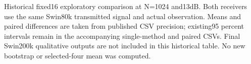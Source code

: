 Historical fixed16 exploratory comparison at N=1024 and13dB. Both receivers use the same Swin80k transmitted signal and actual observation. Means and paired differences are taken from published CSV precision; existing95 percent intervals remain in the accompanying single-method and paired CSVs. Final Swin200k qualitative outputs are not included in this historical table. No new bootstrap or selected-four mean was computed.
